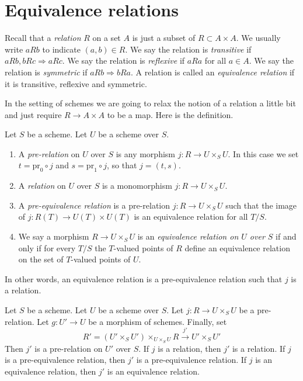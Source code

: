 \section{Equivalence relations}
\label{section-equivalence-relations}

\noindent
Recall that a {\it relation} $R$ on a set $A$ is just a subset
of $R \subset A \times A$. We usually write $a R b$ to indicate
$(a, b) \in R$. We say the relation is {\it transitive} if
$a R b, b R c \Rightarrow a R c$. We say the relation is
{\it reflexive} if $a R a$ for all $a \in A$. We say the relation is
{\it symmetric} if $a R b \Rightarrow b R a$.
A relation is called an {\it equivalence relation} if
it is transitive, reflexive and symmetric.

\medskip\noindent
In the setting of schemes we are going to relax the notion of a
relation a little bit and just require $R \to A \times A$ to
be a map. Here is the definition.

\begin{definition}
\label{definition-equivalence-relation}
Let $S$ be a scheme. Let $U$ be a scheme over $S$.
\begin{enumerate}
\item A {\it pre-relation} on $U$ over $S$ is any morphism
$j : R \to U \times_S U$. In this case we set
$t = \text{pr}_0 \circ j$ and $s = \text{pr}_1 \circ j$, so
that $j = (t, s)$.
\item A {\it relation} on $U$ over $S$ is a monomorphism
$j : R \to U \times_S U$.
\item A {\it pre-equivalence relation} is a pre-relation
$j : R \to U \times_S U$ such that the image of
$j : R(T) \to U(T) \times U(T)$ is an equivalence relation for
all $T/S$.
\item We say a morphism $R \to U \times_S U$ is
an {\it equivalence relation on $U$ over $S$}
if and only if for every $T/S$ the $T$-valued
points of $R$ define an equivalence relation
on the set of $T$-valued points of $U$.
\end{enumerate}
\end{definition}

\noindent
In other words, an equivalence relation is a pre-equivalence relation
such that $j$ is a relation.

\begin{lemma}
\label{lemma-restrict-relation}
Let $S$ be a scheme.
Let $U$ be a scheme over $S$.
Let $j : R \to U \times_S U$ be a pre-relation.
Let $g : U' \to U$ be a morphism of schemes.
Finally, set
$$
R' = (U' \times_S U')\times_{U \times_S U} R
\xrightarrow{j'}
U' \times_S U'
$$
Then $j'$ is a pre-relation on $U'$ over $S$.
If $j$ is a relation, then $j'$ is a relation.
If $j$ is a pre-equivalence relation, then $j'$ is a pre-equivalence relation.
If $j$ is an equivalence relation, then $j'$ is an equivalence relation.
\end{lemma}

